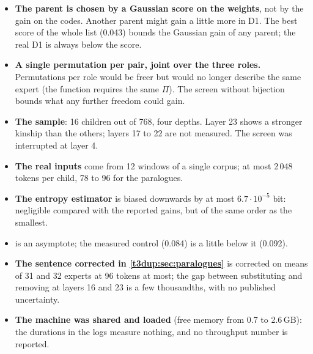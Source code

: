 \begin{faux}
\begin{itemize}
\item \textbf{The parent is chosen by a Gaussian score on the weights}, not by the gain on the codes. Another parent might gain a little more in D1. The best score of the whole list (0.043) bounds the Gaussian gain of any parent; the real D1 is always below the score.
\item \textbf{A single permutation per pair, joint over the three roles.} Permutations per role would be freer but would no longer describe the same expert (the function requires the same $\Pi$). The screen without bijection bounds what any further freedom could gain.
\item \textbf{The sample}: 16 children out of 768, four depths. Layer 23 shows a stronger kinship than the others; layers 17 to 22 are not measured. The screen was interrupted at layer 4.
\item \textbf{The real inputs} come from 12 windows of a single corpus; at most 2\,048 tokens per child, 78 to 96 for the paralogues.
\item \textbf{The entropy estimator} is biased downwards by at most $6.7\cdot10^{-5}$ bit: negligible compared with the reported gains, but of the same order as the smallest.
\item \textbf{} is an asymptote; the measured control (0.084) is a little below it (0.092).
\item \textbf{The sentence corrected in \cref{t3dup:sec:paralogues}} is corrected on means of 31 and 32 experts at 96 tokens at most; the gap between substituting and removing at layers 16 and 23 is a few thousandths, with no published uncertainty.
\item \textbf{The machine was shared and loaded} (free memory from 0.7 to 2.6\,GB): the durations in the logs measure nothing, and no throughput number is reported.
\end{itemize}
\end{faux}
